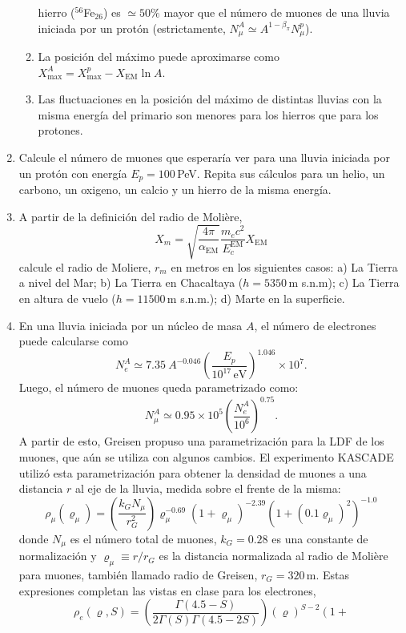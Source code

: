 \documentclass[11pt]{article}
\begin{document}
\begin{enumerate}
\begin{enumerate}
				hierro ($^{56}$Fe$_{26}$) es $\simeq 50\%$ mayor que el número de
				muones de una lluvia iniciada por un protón (estrictamente,
				$N_\mu^A \simeq A^{1-\beta_\pi} N_\mu^p$).
			\item La posición del máximo puede aproximarse como $X_{\max}^A =
				X_{\max}^{p} - X_{\mathrm{EM}} \ln A$.
			\item Las fluctuaciones en la posición del máximo de distintas
				lluvias con la misma energía del primario son menores para los
				hierros que para los protones. 
		\end{enumerate}
	\item Calcule el número de muones que esperaría ver para una lluvia
		iniciada por un protón con energía $E_p = 100$\,PeV. Repita sus
		cálculos para un helio, un carbono, un oxigeno, un calcio y un hierro
		de la misma energía.
	\item A partir de la definición del radio de Molière, 
		\[ X_m = \sqrt{\frac{4\pi}{\alpha_{\mathrm{EM}}}} \frac{m_e
		c^2}{E_{c}^{\mathrm{EM}}} X_{\mathrm{EM}}\]
		calcule el radio de Moliere, $r_m$ en metros en los siguientes casos:
		a) La Tierra a nivel del Mar; b) La Tierra en Chacaltaya ($h=5350$\,m
		s.n.m); c) La Tierra en altura de vuelo ($h=11500$\,m s.n.m.); d) Marte
		en la superficie.
	\item En una lluvia iniciada por un núcleo de masa $A$, el número de
		electrones puede calcularse como 
		\[N_e^A \simeq 7.35\ A^{-0.046} \left (
		\frac{E_p}{10^{17}\mathrm{\,eV}} \right )^{1.046} \times 10^7.\]
		Luego, el número de muones queda parametrizado como:
		\[N_\mu^A \simeq 0.95 \times 10^5  \left ( \frac{N_e^A}{10^6} \right
		)^{0.75}.\]
		A partir de esto, Greisen propuso una parametrización para la LDF de
		los muones, que aún se utiliza con algunos cambios. El experimento
		KASCADE utilizó esta parametrización para obtener la densidad de muones
		a una distancia $r$ al eje de la lluvia, medida sobre el frente de la
		misma:
		\[
			\rho_\mu(\varrho_\mu) = \left (\frac{k_G N_\mu}{r_G^2} \right )
			\varrho_\mu^{-0.69} \left ( 1 + \varrho_\mu \right
			)^{-2.39} \left ( 1 + \left (0.1 \varrho_\mu \right )^2 \right
			)^{-1.0}
		\]
		donde $N_\mu$ es el número total de muones, $k_G=0.28$ es una
		constante de normalización y $\varrho_\mu\equiv r/r_G$ es la distancia
		normalizada al radio de Molière para muones, también llamado radio de
		Greisen, $r_G=320$\,m. Estas expresiones completan las vistas en
		clase para los electrones, 
		\[
			\rho_e(\varrho, S) = \left ( \frac{\Gamma(4.5 - S)}{2 \Gamma(S)
			\Gamma(4.5 - 2S)} \right ) \left( \varrho \right)^{S-2} \left(1 +
\]
\end{enumerate}
\end{document}
